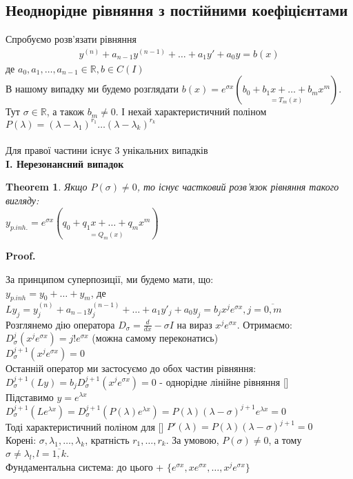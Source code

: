 \documentclass[a4paper, 10pt]{article}
\makeatletter
\def\qed{$\blacksquare$}
\theoremstyle{theoremdd}
\newtheorem{theorem}{Theorem}[subsection]
\theoremstyle{theoremdd}
\theoremstyle{theoremdd}
\theoremstyle{theoremdd}
\theoremstyle{theoremdd}
\theoremstyle{theoremdd}
\theoremstyle{theoremdd}
\theoremstyle{theoremdd}
\renewenvironment{proof}[1][Proof.\\]{\par
\pushQED{\hfill \qed}%
\normalfont \topsep6\p@\@plus6\p@\relax
\trivlist
\item\relax
{\bfseries
#1\@addpunct{.}}\hspace\labelsep\ignorespaces
}{%
\popQED\endtrivlist\@endpefalse
}
\makeatother
\begin{document}
\subsection{Неоднорідне рівняння з постійними коефіцієнтами}
Спробуємо розв'язати рівняння
\begin{align*}
y^{(n)} + a_{n-1}y^{(n-1)}+\dots+a_1y'+a_0y = b(x)
\end{align*}
де $a_0, a_1,\dots,a_{n-1} \in \mathbb{R}, b \in C(I)$\\
В нашому випадку ми будемо розглядати $b(x) = e^{\sigma x} (\underset{= T_m(x)}{b_0 + b_1 x + \dots + b_m x^m} )$. Тут $\sigma \in \mathbb{R}$, а також $b_m \neq 0$.
І нехай характеристичний поліном $P(\lambda) = (\lambda - \lambda_1)^{r_1} \dots (\lambda - \lambda_k)^{r_k}$\\
\\
 Для правої частини існує 3 унікальних випадків\\
\textbf{I. Нерезонансний випадок}
\begin{theorem}
Якщо $P(\sigma) \neq 0$, то існує частковий розв'язок рівняння такого вигляду:\\
$y_{p.inh.} = e^{\sigma x} (\underset{= Q_m(x)}{q_0 + q_1 x + \dots + q_m x^m})$
\end{theorem}

\begin{proof}
За принципом суперпозиції, ми будемо мати, що:\\
$y_{p.inh} = y_0 + \dots + y_m$, де\\
$Ly_j = y^{(n)}_j + a_{n-1}y^{(n-1)}_j +\dots+a_1y'_j +a_0y_j = b_j x^j e^{\sigma x} , j = \overline{0,m}$\\
Розглянемо дію оператора $\displaystyle D_{\sigma} = \frac{d}{dx} - \sigma I$ на вираз $x^j e^{\sigma x}$. Отримаємо:\\
$\displaystyle D^j_{\sigma} \left( x^j e^{\sigma x} \right) = j!e^{\sigma x}$ (можна самому переконатись)\\
$\displaystyle D^{j+1}_{\sigma} \left( x^j e^{\sigma x} \right) = 0$\\
Останній оператор ми застосуємо до обох частин рівняння:\\
$\displaystyle D^{j+1}_{\sigma} (Ly) = b_j \displaystyle D^{j+1}_{\sigma} \left( x^j e^{\sigma x} \right) = 0$ - однорідне лінійне рівняння []\\
Підставимо $y = e^{\lambda x}$ \\
$\displaystyle D^{j+1}_{\sigma} (Le^{\lambda x}) = \displaystyle D^{j+1}_{\sigma} (P(\lambda)e^{\lambda x}) = P(\lambda) (\lambda - \sigma)^{j+1}e^{\lambda x} = 0$\\
Тоді характеристичний поліном для [] $P'(\lambda) = P(\lambda)(\lambda-\sigma)^{j+1} = 0$\\
Корені: $\sigma, \lambda_1, \dots, \lambda_k$, кратність $r_1, \dots, r_k$. За умовою, $P(\sigma) \neq 0$, а тому $\sigma \neq \lambda_l, l = \overline{1,k}$.\\
Фундаментальна система: до цього + $\{e^{\sigma x}, x e^{\sigma x}, \dots, x^j e^{\sigma x} \}$
\end{proof}
\newpage
\end{document}
